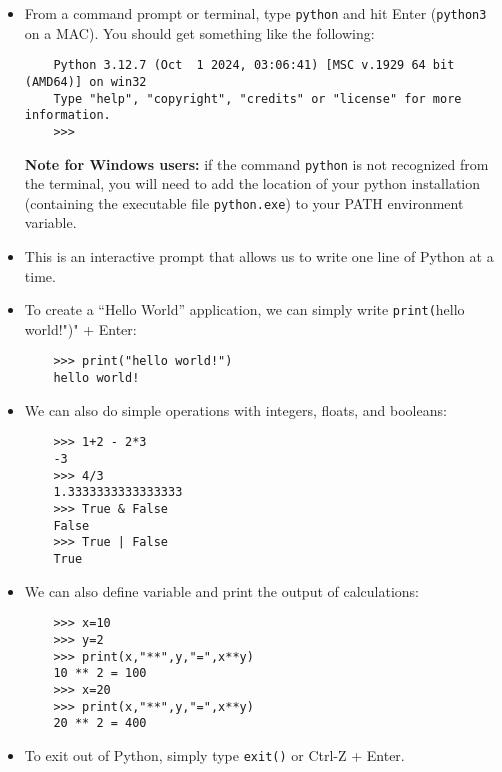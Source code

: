 \documentclass{UNB-Physics-Assignment}
\begin{document}
\begin{itemize}
  \item From a command prompt or terminal, type \verb"python" and hit Enter (\verb"python3" on a MAC). You should get something like the following:
  \begin{verbatim}
    Python 3.12.7 (Oct  1 2024, 03:06:41) [MSC v.1929 64 bit (AMD64)] on win32
    Type "help", "copyright", "credits" or "license" for more information.
    >>>
  \end{verbatim}
  \vspace{-0.75cm}

  \textbf{Note for Windows users:} if the command \verb"python" is not recognized from the terminal, you will need to add the location of your python installation (containing the executable file \verb"python.exe") to your PATH environment variable.

  \item This is an interactive prompt that allows us to write one line of Python at a time.
  \item To create a ``Hello World'' application, we can simply write \verb"print("hello world!")" + Enter:
  \begin{verbatim}
    >>> print("hello world!")
    hello world!
  \end{verbatim}
  \vspace{-0.75cm}

  \item We can also do simple operations with integers, floats, and booleans:
  \begin{verbatim}
    >>> 1+2 - 2*3
    -3
    >>> 4/3
    1.3333333333333333
    >>> True & False
    False
    >>> True | False
    True
  \end{verbatim}
  \vspace{-0.75cm}

  \item We can also define variable and print the output of calculations:
  \begin{verbatim}
    >>> x=10
    >>> y=2
    >>> print(x,"**",y,"=",x**y)
    10 ** 2 = 100
    >>> x=20
    >>> print(x,"**",y,"=",x**y)
    20 ** 2 = 400
  \end{verbatim}
  \vspace{-0.75cm}

  \item To exit out of Python, simply type \verb"exit()" or Ctrl-Z + Enter.
\end{itemize}

\end{document}

